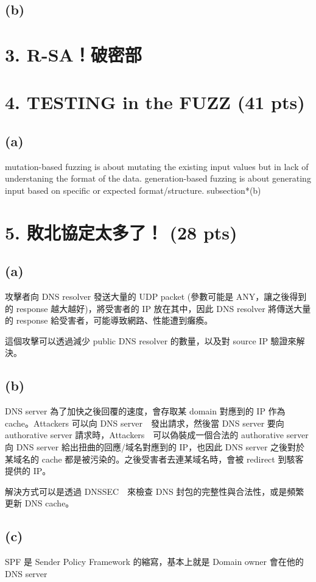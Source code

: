 \documentclass[12pt]{article}
\begin{document}
\subsection*{(b)}

\newpage
\section*{3. R-SA！破密部}

\newpage
\section*{4. TESTING in the FUZZ (41 pts)}
\subsection*{(a)}
mutation-based fuzzing is about mutating the existing input values but in lack of understaning the format of the data. generation-based fuzzing is about generating input based on specific or expected format/structure.
subsection*{(b)}


\newpage
\section*{5. 敗北協定太多了！ (28 pts)}
\subsection*{(a)}
攻擊者向 DNS resolver 發送大量的 UDP packet (參數可能是 ANY，讓之後得到的 response 越大越好)，將受害者的 IP 放在其中，因此 DNS resolver 將傳送大量的 response 給受害者，可能導致網路、性能遭到癱瘓。

這個攻擊可以透過減少 public DNS resolver 的數量，以及對 source IP 驗證來解決。
\subsection*{(b)}
DNS server 為了加快之後回覆的速度，會存取某 domain 對應到的 IP 作為 cache。Attackers 可以向 DNS server　發出請求，然後當 DNS server 要向 authorative server 請求時，Attackers　可以偽裝成一個合法的 authorative server 向 DNS server 給出扭曲的回應/域名對應到的 IP，也因此 DNS server 之後對於某域名的 cache 都是被污染的。之後受害者去連某域名時，會被 redirect 到駭客提供的 IP。

解決方式可以是透過 DNSSEC　來檢查 DNS 封包的完整性與合法性，或是頻繁更新 DNS cache。
\subsection*{(c)}
SPF 是 Sender Policy Framework 的縮寫，基本上就是 Domain owner 會在他的 DNS server 
\end{document}
